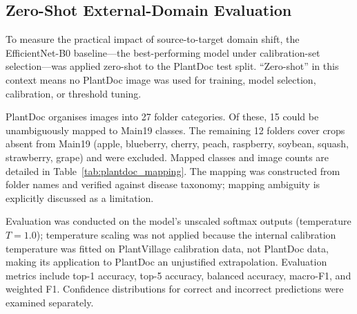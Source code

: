 \documentclass[conference]{IEEEtran}
\begin{document}
\subsection{Zero-Shot External-Domain Evaluation}

To measure the practical impact of source-to-target domain shift, the
EfficientNet-B0 baseline---the best-performing model under calibration-set
selection---was applied zero-shot to the PlantDoc test split. ``Zero-shot'' in
this context means no PlantDoc image was used for training, model selection,
calibration, or threshold tuning.

PlantDoc organises images into 27 folder categories. Of these, 15 could be
unambiguously mapped to Main19 classes. The remaining 12 folders cover crops
absent from Main19 (apple, blueberry, cherry, peach, raspberry, soybean, squash,
strawberry, grape) and were excluded. Mapped classes and image counts are
detailed in Table~\ref{tab:plantdoc_mapping}. The mapping was constructed from
folder names and verified against disease taxonomy; mapping ambiguity is
explicitly discussed as a limitation.

Evaluation was conducted on the model's unscaled softmax outputs (temperature
$T=1.0$); temperature scaling was not applied because the internal calibration
temperature was fitted on PlantVillage calibration data, not PlantDoc data,
making its application to PlantDoc an unjustified extrapolation.
Evaluation metrics include top-1 accuracy, top-5 accuracy, balanced accuracy,
macro-F1, and weighted F1. Confidence distributions for correct and incorrect
predictions were examined separately.
\end{document}
